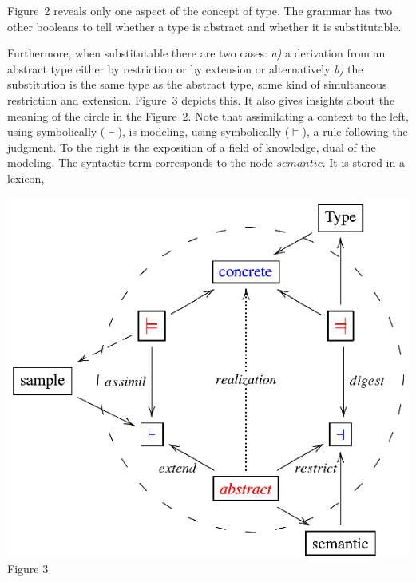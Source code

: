 Figure~2 reveals only one aspect of the concept 
of type. The grammar has two other booleans to tell whether a type is
abstract and whether it is substitutable.\\ 
\noindent
\begin{minipage}[h]{5.2cm}
\indent
Furthermore, when 
substitutable there are two cases: {\it a)} a derivation from an abstract type
either by restriction or by extension or alternatively {\it b)} the substitution is 
the same type as the abstract type, some kind of simultaneous restriction 
and extension. 
Figure~3 depicts this. It also
gives insights about the meaning of the circle in the Figure~2.
Note that assimilating a context to the left, using symbolically ($\vdash$), 
is \underline{modeling}, using symbolically ($\models$), a rule following the judgment. 
To the right is the exposition of a field of knowledge, dual of the modeling. 
The syntactic term corresponds to the node $semantic$. It is stored in a lexicon,

\end{minipage}
\begin{minipage}[h]{8.8cm}
 \begin{center}

  \includegraphics[]{part8/Viallefond_P52/P52_3.eps}
\\ Figure 3

 \end{center}
\end{minipage}
\hfill
